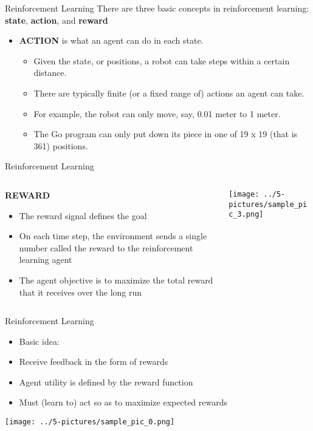 \documentclass[11pt]{beamer}
\begin{document}
\begin{frame}{Reinforcement Learning}
There are three basic concepts in reinforcement learning: \textbf{state}, \textbf{action}, and \textbf{reward} \\
\vspace{.5cm}
	\begin{itemize}
		\item \textbf{ACTION} is what an agent can do in each state. 
		\begin{itemize}
		\item Given the state, or positions, a robot can take steps within a certain distance. 
		\item There are typically finite (or a fixed range of) actions an agent can take. 
		\item For example, the robot can only move, say, 0.01 meter to 1 meter. 
		\item The Go program can only put down its piece in one of 19 x 19 (that is 361) positions.  
		\end{itemize}
	\end{itemize}
\end{frame}
\begin{frame}{Reinforcement Learning}
\begin{columns}[T] %
\begin{column}{.48\textwidth}
\textbf{REWARD}
        \begin{itemize}
		\item The reward signal defines the goal
		\item On each time step, the environment sends a single number called the reward to the reinforcement learning agent
		\item The agent objective is to maximize the total reward that it receives over the long run
\end{itemize}
\end{column}%
\hfill%
\begin{column}{.48\textwidth}
        \texttt{[image: ../5-pictures/sample\_pic\_3.png]}
\end{column}%
\end{columns}
\end{frame}
\begin{frame}{Reinforcement Learning}
	\begin{itemize}
		\item Basic idea:
		\item Receive feedback in the form of rewards
		\item Agent utility is defined by the reward function
		\item Must (learn to) act so as to maximize expected rewards
	\end{itemize}
	\begin{center}
	\texttt{[image: ../5-pictures/sample\_pic\_0.png]}
	\end{center}
\end{frame}
\end{document}
